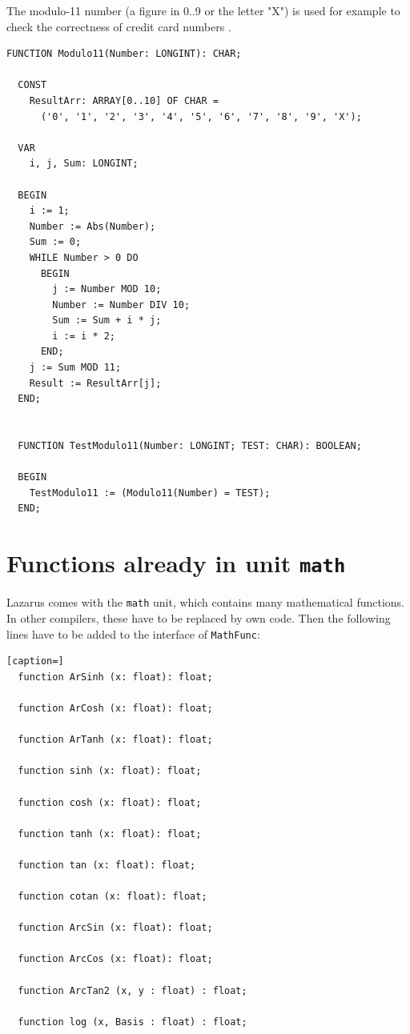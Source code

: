 \begin{refsection}
The modulo-11 number (a figure in 0..9 or the letter "X") is used for example to check the correctness of credit card numbers \parencite{Mic-96}.


\begin{lstlisting}[caption=test number by modulo-11 method]
  FUNCTION Modulo11(Number: LONGINT): CHAR;

  CONST
    ResultArr: ARRAY[0..10] OF CHAR =
      ('0', '1', '2', '3', '4', '5', '6', '7', '8', '9', 'X');

  VAR
    i, j, Sum: LONGINT;

  BEGIN
    i := 1;
    Number := Abs(Number);
    Sum := 0;
    WHILE Number > 0 DO
      BEGIN
        j := Number MOD 10;
        Number := Number DIV 10;
        Sum := Sum + i * j;
        i := i * 2;
      END;
    j := Sum MOD 11;
    Result := ResultArr[j];
  END;


  FUNCTION TestModulo11(Number: LONGINT; TEST: CHAR): BOOLEAN;

  BEGIN
    TestModulo11 := (Modulo11(Number) = TEST);
  END;
\end{lstlisting}

\section{Functions already in unit \texttt{math}}

Lazarus comes with the \texttt{math} unit, which contains many mathematical functions. In other compilers, these have to be replaced by own code. Then the following lines have to be added to the interface of \texttt{MathFunc}:
\begin{lstlisting}[caption=]
  function ArSinh (x: float): float;

  function ArCosh (x: float): float;

  function ArTanh (x: float): float;

  function sinh (x: float): float;

  function cosh (x: float): float;

  function tanh (x: float): float;

  function tan (x: float): float;

  function cotan (x: float): float;

  function ArcSin (x: float): float;

  function ArcCos (x: float): float;

  function ArcTan2 (x, y : float) : float;

  function log (x, Basis : float) : float;
\end{lstlisting}


\end{refsection}
